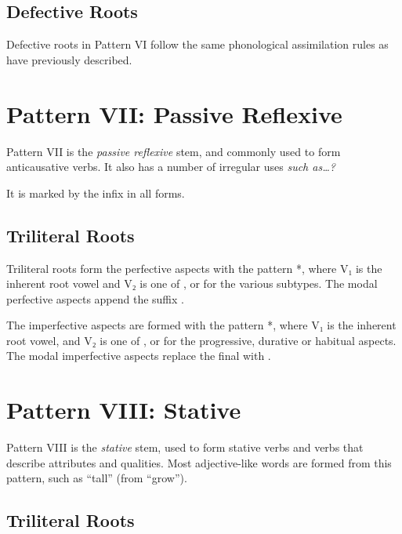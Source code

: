 \documentclass[grammar]{subfiles}
\begin{document}
\subsection{Defective Roots}
\label{ssec:vm_vi_defective_roots}

Defective roots in Pattern VI follow the same phonological assimilation rules
as have previously described. 


\section{Pattern VII: Passive Reflexive}
\label{sec:vm_pattern_vii}

Pattern VII is the \emph{passive reflexive} stem, and commonly used to form
anticausative verbs.  It also has a number of irregular uses \tbw\emph{such as…?}
%

It is marked by the infix  in all forms.


\subsection{Triliteral Roots}
\label{ssec:vm_vii_triliteral_roots}

Triliteral roots form the perfective aspects with the pattern
*, where V₁ is the inherent root vowel and V₂ is one of
,  or  for the various subtypes.  The modal perfective
aspects append the suffix .

The imperfective aspects are formed with the pattern *,
where V₁ is the inherent root vowel, and V₂ is one of ,  or
 for the progressive, durative or habitual aspects.  The modal
imperfective aspects replace the final  with .


\section{Pattern VIII: Stative} \label{sec:vm_pattern_viii}

Pattern VIII is the \emph{stative} stem, used to form stative verbs and verbs
that describe attributes and qualities.  Most adjective-like words are formed
from this pattern, such as  “tall” (from  “grow”).


\subsection{Triliteral Roots}
\label{ssec:vm_viii_triliteral_roots}
\end{document}

